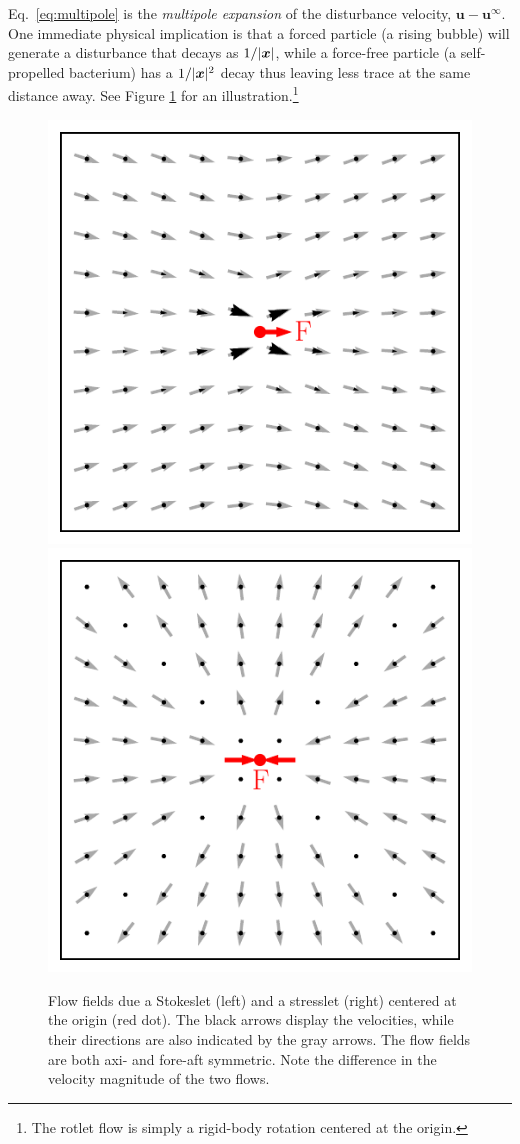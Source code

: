 Eq.\ \eqref{eq:multipole} is the \emph{multipole expansion} of the disturbance velocity, ${\bm u}-{\bm u}^\infty$. One immediate physical implication is that a forced particle (\eg a rising bubble) will generate a disturbance that decays as $1/\lvert\bm x\rvert$, while a force-free particle (\eg a self-propelled bacterium) has a $1/\lvert\bm x\rvert^2$ decay thus leaving less trace at the same distance away. See Figure \ref{fig:lets} for an illustration.\footnote{The rotlet flow is simply a rigid-body rotation centered at the origin.}

\begin{figure}%
  \centering
  \includegraphics[width=0.49\columnwidth]{stokeslet1.pdf}
  \includegraphics[width=0.49\columnwidth]{stresslet1.pdf}
  \caption{Flow fields due a Stokeslet (left) and a stresslet (right) centered at the origin (red dot). The black arrows display the velocities, while their directions are also indicated by the gray arrows. The flow fields are both axi- and fore-aft symmetric. Note the difference in the velocity magnitude of the two flows.}
  \label{fig:lets}
\end{figure}


